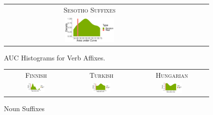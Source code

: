 \documentclass[11pt,letterpaper]{article}
\begin{document}
\begin{figure}
\begin{tabular}{cccccc}
            \\
            \textsc{Sesotho Suffixes} \\
            \includegraphics[width=0.3\textwidth]{figures/sesotho_suffixes/suffixes-byMorphemes-auc-hist-heldout-Coarse-FineSurprisal-optimized.pdf}
    \end{tabular}

    
    \caption{AUC Histograms for Verb Affixes.}
    \label{fig:auc_verbs}
\end{figure}


\begin{figure}
\begin{tabular}{ccc}
\textsc{Finnish} & \textsc{Turkish} & \textsc{Hungarian} \\
    \includegraphics[width=0.3\textwidth]{figures/finnish_nouns/suffixes-byMorphemes-auc-hist-heldout-Coarse-FineSurprisal-optimized.pdf}
    &
    \includegraphics[width=0.3\textwidth]{figures/turkish_nouns/suffixes-byMorphemes-auc-hist-heldout-Coarse-FineSurprisal-optimized.pdf}
    &
    \includegraphics[width=0.3\textwidth]{figures/hungarian_nouns/suffixes-byMorphemes-auc-hist-heldout-Coarse-FineSurprisal-optimized.pdf}
    \end{tabular}
    \caption{Noun Suffixes}
    \label{fig:auc_nouns}
\end{figure}
\end{document}
